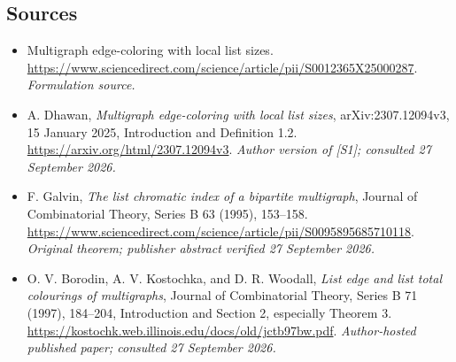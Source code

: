 \documentclass[11pt]{article}
\begin{document}
\subsection{Sources}
\begin{itemize}
\item[S1]Multigraph edge-coloring with local list sizes.
\url{https://www.sciencedirect.com/science/article/pii/S0012365X25000287}.
\textit{Formulation source.}
\item[E1] A. Dhawan, \emph{Multigraph edge-coloring with local list sizes},
arXiv:2307.12094v3, 15 January 2025, Introduction and Definition 1.2.
\url{https://arxiv.org/html/2307.12094v3}.
\textit{Author version of [S1]; consulted 27 September 2026.}
\item[E2] F. Galvin, \emph{The list chromatic index of a bipartite multigraph},
Journal of Combinatorial Theory, Series B 63 (1995), 153--158.
\url{https://www.sciencedirect.com/science/article/pii/S0095895685710118}.
\textit{Original theorem; publisher abstract verified 27 September 2026.}
\item[E3] O. V. Borodin, A. V. Kostochka, and D. R. Woodall,
\emph{List edge and list total colourings of multigraphs},
Journal of Combinatorial Theory, Series B 71 (1997), 184--204,
Introduction and Section 2, especially Theorem 3.
\url{https://kostochk.web.illinois.edu/docs/old/jctb97bw.pdf}.
\textit{Author-hosted published paper; consulted 27 September 2026.}
\end{itemize}
\end{document}

